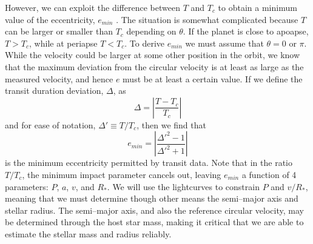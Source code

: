 However, we can exploit the difference between $T$ and $T_c$ to obtain
a minimum value of the eccentricity, $e_{min}$ \citep{Barnes07}. The
situation is somewhat complicated because $T$ can be larger or smaller
than $T_c$ depending on $\theta$. If the planet is close to apoapse,
$T > T_c$, while at periapse $T < T_c$. To derive $e_{min}$ we must
assume that $\theta = 0$ or $\pi$. While the velocity could be larger
at some other position in the orbit, we know that the maximum
deviation from the circular velocity is at least as large as the
measured velocity, and hence $e$ must be at least a certain value. If
we define the transit duration deviation, $\Delta$, as
\begin{equation}\label{eq:tdd}
\Delta = \left|\frac{T-T_c}{T_c}\right|
\end{equation}
and for ease of notation, $\Delta' \equiv T/T_c$,
then we find that
\begin{equation}\label{eq:emin}
e_{min} = \left|\frac{\Delta'^2 - 1}{\Delta'^2 + 1}\right|
\end{equation}
is the minimum eccentricity permitted by transit data.  Note that in
the ratio $T/T_c$, the minimum impact parameter cancels out, leaving
$e_{min}$ a function of 4 parameters: $P$, $a$, $v$, and $R_*$.  We
will use the \kepler lightcurves to constrain $P$ and $v/R_*$, meaning
that we must determine though other means the semi--major axis and
stellar radius.  The semi--major axis, and also the reference circular
velocity, may be determined through the host star mass, making it
critical that we are able to estimate the stellar mass and radius
reliably.

\medskip
{\centerline{}}
\smallskip

